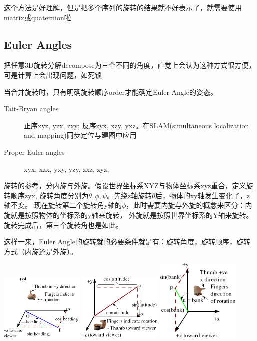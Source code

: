 这个方法是好理解，但是把多个序列的旋转的结果就不好表示了，就需要使用matrix或quaternion啦

\subsection{Euler Angles}
把任意3D旋转分解decompose为三个不同的角度，直觉上会认为这种方式很方便，可是计算上会出现问题，如死锁


当合并旋转时，只有明确旋转顺序order才能确定Euler Angle的姿态。
\begin{description}
    \item [Tait-Bryan angles] \textsf{正序xyz, yzx, zxy; 反序zyx, xzy, yxz。在SLAM(simultaneous localization and mapping)同步定位与建图中应用}
    \item [Proper Euler angles] \textsf{xyx, xzx, yxy, yzy, zxz, zyz,}
\end{description}

旋转的参考，分内旋与外旋。假设世界坐标系XYZ与物体坐标系xyz重合，定义旋转顺序zyx,
旋转角度分别为$\theta, \phi, \psi$。先绕z轴旋转$\theta$后，物体的xy轴发生变化了，z轴不变。
现在旋转第二个旋转角y轴的$\phi$，此时需要内旋与外旋的概念来区分：内旋就是按照物体的坐标系的y轴来旋转，
外旋就是按照世界坐标系的Y轴来旋转。
旋转完成后，第三个旋转角也是如此。

这样一来，Euler Angle的旋转就的必要条件就是有：旋转角度，旋转顺序，旋转方式（内旋还是外旋）。

\begin{center}
    \includegraphics[width=0.3\textwidth]{images/heading.png}
    \includegraphics[width=0.3\textwidth]{images/attitude.png}
    \includegraphics[width=0.3\textwidth]{images/bank.png}
\end{center}

